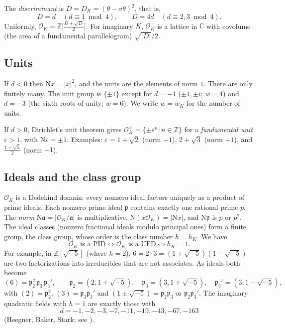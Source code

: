 \documentclass[11pt]{article}
\numberwithin{equation}{section}
\newcommand{\N}{\mathrm N}
\newcommand{\Z}{\mathbb Z}
\newcommand{\OK}{\mathcal O_K}
\newcommand{\p}{\mathfrak p}
\theoremstyle{definition}
\theoremstyle{remark}
\begin{document}
The \emph{discriminant} is $D=D_K=(\theta-\sigma\theta)^2$, that is,
\begin{equation}\label{eq:disc}
 D=d\quad(d\equiv1\bmod 4),\qquad D=4d\quad(d\equiv2,3\bmod4).
\end{equation}
Uniformly, $\OK=\Z\bigl[\tfrac{D+\sqrt D}2\bigr]$. For imaginary $K$, $\OK$ is a lattice in
$\mathbb C$ with covolume (the area of a fundamental parallelogram) $\sqrt{|D|}/2$.

\subsection{Units}
If $d<0$ then $\N x=|x|^2$, and the units are the elements of norm $1$. There are only
finitely many. The unit group is $\{\pm1\}$ except for $d=-1$ ($\pm1,\pm i$; $w=4$) and
$d=-3$ (the sixth roots of unity; $w=6$). We write $w=w_K$ for the number of units.

If $d>0$, Dirichlet's unit theorem gives $\OK^\times=\{\pm\varepsilon^n:n\in\Z\}$ for a
\emph{fundamental unit} $\varepsilon>1$, with $\N\varepsilon=\pm1$. Examples:
$\varepsilon=1+\sqrt2$ (norm $-1$), $2+\sqrt3$ (norm $+1$), and $\frac{1+\sqrt5}2$ (norm $-1$).

\subsection{Ideals and the class group}
$\OK$ is a Dedekind domain: every nonzero ideal factors uniquely as a product of prime
ideals. Each nonzero prime ideal $\p$ contains exactly one rational prime $p$. The
\emph{norm} $\N\mathfrak a=|\OK/\mathfrak a|$ is multiplicative, $\N(x\OK)=|\N x|$, and $\N\p$ is
$p$ or $p^2$. The ideal classes (nonzero fractional ideals modulo principal ones) form a
finite group, the class group, whose order is the class number $h=h_K$. We have
\begin{equation}\label{eq:pid}
 \OK\text{ is a PID}\iff\OK\text{ is a UFD}\iff h_K=1 .
\end{equation}
For example, in $\Z[\sqrt{-5}]$ (where $h=2$),
$6=2\cdot3=(1+\sqrt{-5})(1-\sqrt{-5})$ are two factorizations into irreducibles that are
not associates. As ideals both become
\begin{equation}\label{eq:sqrtm5}
 (6)=\p_2^2\,\p_3\,\p_3',\qquad \p_2=(2,1+\sqrt{-5}),\quad \p_3=(3,1+\sqrt{-5}),\quad
 \p_3'=(3,1-\sqrt{-5}),
\end{equation}
with $(2)=\p_2^2$, $(3)=\p_3\p_3'$ and $(1\pm\sqrt{-5})=\p_2\p_3$ or $\p_2\p_3'$. The
imaginary quadratic fields with $h=1$ are exactly those with
\begin{equation}\label{eq:heegner}
 d=-1,-2,-3,-7,-11,-19,-43,-67,-163
\end{equation}
(Heegner, Baker, Stark; see \cite{Cox}).
\end{document}
